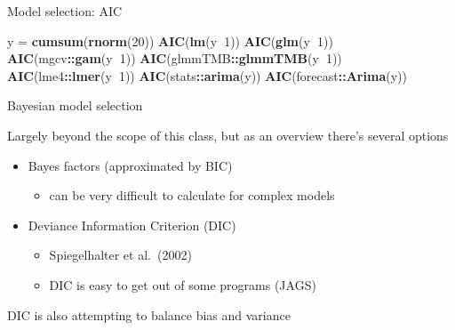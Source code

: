\documentclass[ignorenonframetext,]{beamer}
\newenvironment{Shaded}{\begin{snugshade}}{\end{snugshade}}
\newcommand{\DecValTok}[1]{\textcolor[rgb]{0.00,0.00,0.81}{#1}}
\newcommand{\KeywordTok}[1]{\textcolor[rgb]{0.13,0.29,0.53}{\textbf{#1}}}
\newcommand{\NormalTok}[1]{#1}
\newcommand{\OperatorTok}[1]{\textcolor[rgb]{0.81,0.36,0.00}{\textbf{#1}}}
\newcommand{\StringTok}[1]{\textcolor[rgb]{0.31,0.60,0.02}{#1}}
\providecommand{\tightlist}{%
  \setlength{\itemsep}{0pt}\setlength{\parskip}{0pt}}
\begin{document}
\begin{frame}[fragile]
\begin{block}{Model selection: AIC}
\begin{Shaded}
\begin{Highlighting}[]
\NormalTok{y =}\StringTok{ }\KeywordTok{cumsum}\NormalTok{(}\KeywordTok{rnorm}\NormalTok{(}\DecValTok{20}\NormalTok{))}
\KeywordTok{AIC}\NormalTok{(}\KeywordTok{lm}\NormalTok{(y}\OperatorTok{~}\DecValTok{1}\NormalTok{))}
\KeywordTok{AIC}\NormalTok{(}\KeywordTok{glm}\NormalTok{(y}\OperatorTok{~}\DecValTok{1}\NormalTok{))}
\KeywordTok{AIC}\NormalTok{(mgcv}\OperatorTok{::}\KeywordTok{gam}\NormalTok{(y}\OperatorTok{~}\DecValTok{1}\NormalTok{))}
\KeywordTok{AIC}\NormalTok{(glmmTMB}\OperatorTok{::}\KeywordTok{glmmTMB}\NormalTok{(y}\OperatorTok{~}\DecValTok{1}\NormalTok{))}
\KeywordTok{AIC}\NormalTok{(lme4}\OperatorTok{::}\KeywordTok{lmer}\NormalTok{(y}\OperatorTok{~}\DecValTok{1}\NormalTok{))}
\KeywordTok{AIC}\NormalTok{(stats}\OperatorTok{::}\KeywordTok{arima}\NormalTok{(y))}
\KeywordTok{AIC}\NormalTok{(forecast}\OperatorTok{::}\KeywordTok{Arima}\NormalTok{(y))}
\end{Highlighting}
\end{Shaded}

\end{block}

\begin{block}{Bayesian model selection}

Largely beyond the scope of this class, but as an overview there's
several options

\begin{itemize}
\tightlist
\item
  Bayes factors (approximated by BIC)

  \begin{itemize}
  \tightlist
  \item
    can be very difficult to calculate for complex models
  \end{itemize}
\item
  Deviance Information Criterion (DIC)

  \begin{itemize}
  \tightlist
  \item
    Spiegelhalter et al.~(2002)
  \item
    DIC is easy to get out of some programs (JAGS)
  \end{itemize}
\end{itemize}

DIC is also attempting to balance bias and variance

\end{block}


\end{frame}
\end{document}
